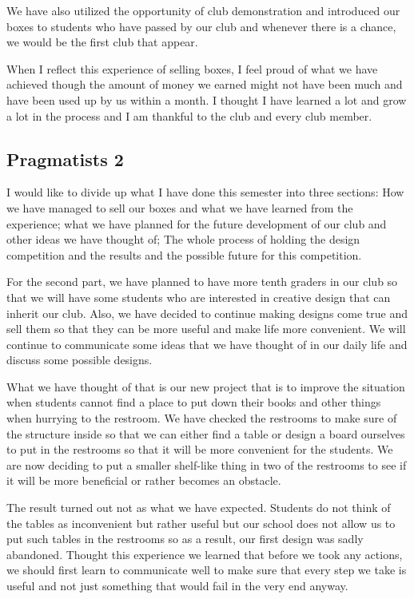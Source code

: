 \documentclass[11pt,a4paper,titlepage]{article}
\begin{document}
We have also utilized the opportunity of club demonstration and introduced our boxes to students who have passed by our club and whenever there is a chance, we would be the first club that appear.

When I reflect this experience of selling boxes, I feel proud of what we have achieved though the amount of money we earned might not have been much and have been used up by us within a month. I thought I have learned a lot and grow a lot in the process and I am thankful to the club and every club member.

\subsection{Pragmatists 2}
I would like to divide up what I have done this semester into three sections: How we have managed to sell our boxes and what we have learned from the experience; what we have planned for the future development of our club and other ideas we have thought of; The whole process of holding the design competition and the results and the possible future for this competition.

For the second part, we have planned to have more tenth graders in our club so that we will have some students who are interested in creative design that can inherit our club. Also, we have decided to continue making designs come true and sell them so that they can be more useful and make life more convenient. We will continue to communicate some ideas that we have thought of in our daily life and discuss some possible designs.

What we have thought of that is our new project that is to improve the situation when students cannot find a place to put down their books and other things when hurrying to the restroom. We have checked the restrooms to make sure of the structure inside so that we can either find a table or design a board ourselves to put in the restrooms so that it will be more convenient for the students. We are now deciding to put a smaller shelf-like thing in two of the restrooms to see if it will be more beneficial or rather becomes an obstacle.

The result turned out not as what we have expected. Students do not think of the tables as inconvenient but rather useful but our school does not allow us to put such tables in the restrooms so as a result, our first design was sadly abandoned. Thought this experience we learned that before we took any actions, we should first learn to communicate well to make sure that every step we take is useful and not just something that would fail in the very end anyway.
\end{document}
